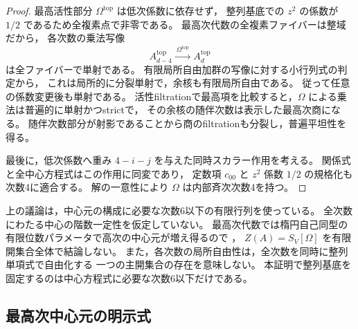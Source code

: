 \begin{proof}
最高活性部分 $\Omega^{\mathrm{top}}$ は低次係数に依存せず，
整列基底での $z^2$ の係数が $1/2$ であるため全複素点で非零である。
最高次代数の全複素ファイバーは整域だから，
各次数の乗法写像
\[
 A^{\mathrm{top}}_{d-4}\xrightarrow{\ \Omega^{\mathrm{top}}\ }
 A^{\mathrm{top}}_d
\]
は全ファイバーで単射である。
有限局所自由加群の写像に対する小行列式の判定から，
これは局所的に分裂単射で，余核も有限局所自由である。
従って任意の係数変更後も単射である。
活性filtrationで最高項を比較すると，$\Omega$ による乗法は普遍的に単射かつstrictで，
その余核の随伴次数は表示した最高次商になる。
随伴次数部分が射影であることから商のfiltrationも分裂し，普遍平坦性を得る。

最後に，低次係数へ重み $4-i-j$ を与えた同時スカラー作用を考える。
関係式と全中心方程式はこの作用に同変であり，
定数項 $c_{00}$ と $z^2$ 係数 $1/2$ の規格化も次数4に適合する。
解の一意性により $\Omega$ は内部斉次次数4を持つ。
\end{proof}

\begin{remark}\label{rem:elliptic-center-scope}
上の議論は，中心元の構成に必要な次数6以下の有限行列を使っている。
全次数にわたる中心の階数一定性を仮定していない。
最高次代数では楕円自己同型の有限位数パラメータで高次の中心元が増え得るので
\cite[Theorem II]{ATV1991}，
$Z(A)=S_V[\Omega]$ を有限開集合全体で結論しない。
また，各次数の局所自由性は，全次数を同時に整列単項式で自由化する
一つの主開集合の存在を意味しない。
本証明で整列基底を固定するのは中心方程式に必要な次数6以下だけである。
\end{remark}

\subsection{最高次中心元の明示式}

